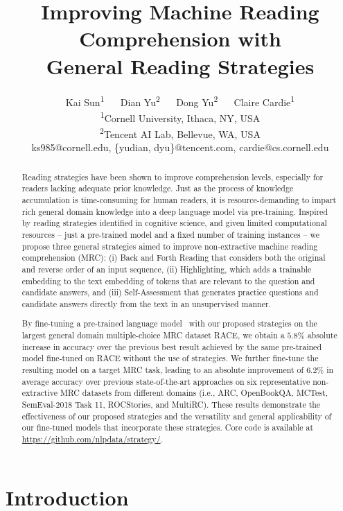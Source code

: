 \documentclass[11pt,a4paper]{article}
\title{Improving Machine Reading Comprehension with \\General Reading Strategies}
\author{
  Kai Sun\textsuperscript{1}\Thanks{This work was done when K. S. was an intern at the Tencent AI Lab, Bellevue, WA.}
  ~~ Dian Yu\textsuperscript{2} ~~ Dong Yu\textsuperscript{2} ~~ Claire Cardie\textsuperscript{1}\\
 \textsuperscript{1}Cornell University, Ithaca, NY, USA \\
 \textsuperscript{2}Tencent AI Lab, Bellevue, WA, USA\\
   ks985@cornell.edu, \{yudian, dyu\}@tencent.com, cardie@cs.cornell.edu \\
}
\date{}
\newcommand{\ie}{{i.e.}}
\begin{document}
\maketitle


\begin{abstract}

Reading strategies have been shown to improve comprehension levels, especially
for readers lacking adequate prior knowledge. Just as the process of knowledge accumulation is time-consuming for human readers, it is resource-demanding to impart rich general domain knowledge into a deep language model via pre-training. Inspired by reading strategies identified in cognitive science, and given limited computational resources -- just a pre-trained model and a fixed number of training instances -- we propose three general strategies aimed to improve non-extractive machine reading comprehension (MRC): (i) {\sc Back and Forth Reading} that considers both the original and reverse order of an input sequence, (ii) {\sc Highlighting}, which adds a trainable embedding to the text embedding of tokens that are relevant to the question and candidate answers, and (iii) {\sc Self-Assessment} that generates practice questions and candidate answers directly from the text in an unsupervised manner. 



By fine-tuning a pre-trained language model~\cite{radfordimproving} with our proposed strategies on the largest general domain multiple-choice MRC dataset RACE, we obtain a $5.8\%$ absolute increase in accuracy over the previous best result achieved by the same pre-trained model fine-tuned on RACE without the use of strategies. We further fine-tune the resulting model on a target MRC task, leading to an absolute improvement of $6.2\%$ in average accuracy over previous state-of-the-art approaches on six representative non-extractive MRC datasets from different domains (\ie, ARC, OpenBookQA, MCTest, SemEval-2018 Task 11, ROCStories, and MultiRC). These results demonstrate the effectiveness of our proposed strategies and the versatility and general applicability of our fine-tuned models that incorporate these strategies. Core code is available at \url{https://github.com/nlpdata/strategy/}.















\end{abstract} \section{Introduction}
\end{document}
